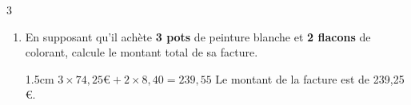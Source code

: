 \documentclass[a4paper]{book}
\begin{document}
{\begin{exerciceNote}{3}
        \begin{enumerate}[resume, leftmargin=*]
            \item En supposant qu'il achète \textbf{3 pots} de peinture blanche et \textbf{2 flacons} de colorant, calcule le montant total de sa facture.
               
            \begin{ZoneReponse}{1.5cm}
                $3\times74,25€+2\times8,40=239,55$  \quad Le montant de la facture est de 239,25 €.
            \end{ZoneReponse} 
        \end{enumerate}
    \end{exerciceNote} 


}
\end{document}
